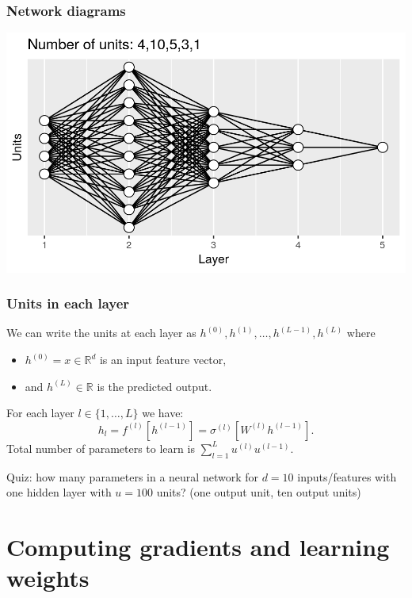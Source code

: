 \documentclass{beamer}
\begin{document}
\begin{frame}
  \frametitle{Network diagrams}

\includegraphics[width=\textwidth]{figure-architecture-fiveLayers}
\end{frame}

\begin{frame}
  \frametitle{Units in each layer}
We can write the units at each layer as
$h^{(0)},h^{(1)},\dots, h^{(L-1)}, h^{(L)}$ where
\begin{itemize}
\item $h^{(0)}=x\in\mathbb R^d$ is an input feature vector,
\item and
$h^{(L)}\in\mathbb R$ is the predicted output.
\end{itemize}
For
each layer $l\in \{1, \dots, L\}$ we have:
\begin{equation*}
  \label{eq:h_l}
  h_l = f^{(l)}\left[h^{(l-1)}\right] =
  \sigma^{(l)}\left[ W^{(l)} h^{(l-1)} \right].
\end{equation*}
Total number of parameters to learn is
$\sum_{l=1}^L u^{(l)} u^{(l-1)}.$

Quiz: how many parameters in a
neural network for $d=10$ inputs/features with one hidden layer with
$u=100$ units? (one output unit, ten output units)
\end{frame}

\section{Computing gradients and learning weights}
\end{document}
